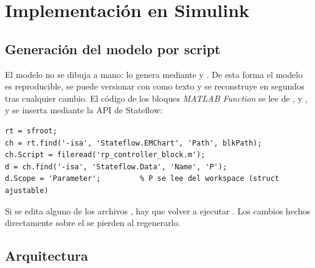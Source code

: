 \chapter{Implementación en Simulink}
\label{cap:simulink}

\section{Generación del modelo por script}

El modelo  no se dibuja a mano: lo genera  mediante  y . De esta forma el modelo es reproducible, se puede versionar con  como texto y se reconstruye en segundos tras cualquier cambio. El código de los bloques \emph{MATLAB Function} se lee de ,  y , y se inserta mediante la API de Stateflow:

\begin{lstlisting}[caption={Inserción del código de un bloque \emph{MATLAB Function} y declaración de \code{P} como parámetro.}]
rt = sfroot;
ch = rt.find('-isa', 'Stateflow.EMChart', 'Path', blkPath);
ch.Script = fileread('rp_controller_block.m');
d = ch.find('-isa', 'Stateflow.Data', 'Name', 'P');
d.Scope = 'Parameter';         % P se lee del workspace (struct ajustable)
\end{lstlisting}

\begin{aviso}
Si se edita alguno de los archivos , hay que volver a ejecutar . Los cambios hechos directamente sobre el  se pierden al regenerarlo.
\end{aviso}

\section{Arquitectura}


